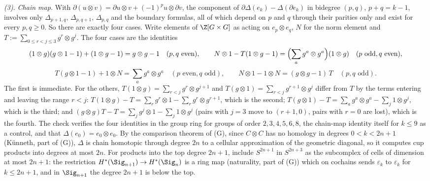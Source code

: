 \emph{(3).} \emph{Chain map.} With $\partial(u \otimes v) = \partial u \otimes v + (-1)^{p}u \otimes \partial v$, the component of $\partial\Delta(e_{k}) - \Delta(\partial e_{k})$ in bidegree $(p, q)$, $p + q = k - 1$, involves only $\Delta_{p+1,q}$, $\Delta_{p,q+1}$, $\Delta_{p,q}$ and the boundary formulas, all of which depend on $p$ and $q$ through their parities only and exist for every $p, q \geq 0$. So there are exactly four cases. Write elements of $\Z[G \times G]$ as acting on $e_{p} \otimes e_{q}$, $N$ for the norm element and $T := \sum_{0 \leq r < j \leq 3} g^{r} \otimes g^{j}$. The four cases are the identities
\[
(1 \otimes g)(g \otimes 1 - 1) + (1 \otimes g - 1) = g \otimes g - 1 \quad (p, q \text{ even}), \qquad
N \otimes 1 - T(1 \otimes g - 1) = \Bigl(\sum_{a} g^{a} \otimes g^{a}\Bigr)(1 \otimes g) \quad (p \text{ odd}, q \text{ even}),
\]
\[
T(g \otimes 1 - 1) + 1 \otimes N = \sum_{a} g^{a} \otimes g^{a} \quad (p \text{ even}, q \text{ odd}), \qquad
N \otimes 1 - 1 \otimes N = (g \otimes g - 1)\,T \quad (p, q \text{ odd}).
\]
The first is immediate. For the others, $T(1 \otimes g) = \sum_{r < j} g^{r} \otimes g^{j+1}$ and $T(g \otimes 1) = \sum_{r<j} g^{r+1} \otimes g^{j}$ differ from $T$ by the terms entering and leaving the range $r < j$: $T(1 \otimes g) - T = \sum_{r} g^{r} \otimes 1 - \sum_{r} g^{r} \otimes g^{r+1}$, which is the second; $T(g \otimes 1) - T = \sum_{a} g^{a} \otimes g^{a} - \sum_{j} 1 \otimes g^{j}$, which is the third; and $(g \otimes g)T - T = \sum_{j} g^{j} \otimes 1 - \sum_{j} 1 \otimes g^{j}$ (pairs with $j = 3$ move to $(r+1, 0)$, pairs with $r = 0$ are lost), which is the fourth. The check verifies the four identities in the group ring for groups of order $2, 3, 4, 5, 6, 8$, the chain-map identity itself for $k \leq 9$ as a control, and that $\Delta(e_{0}) = e_{0} \otimes e_{0}$. By the comparison theorem of (G), since $C \otimes C$ has no homology in degrees $0 < k < 2n+1$ (K\"unneth, part of (G)), $\Delta$ is chain homotopic through degree $2n$ to a cellular approximation of the geometric diagonal, so it computes cup products into degrees at most $2n$. For products into the top degree $2n+1$, include $S^{2n+1}$ in $S^{2n+3}$ as the subcomplex of cells of dimension at most $2n+1$: the restriction $H^{*}(\Sig_{n+1}) \to H^{*}(\Sig_{n})$ is a ring map (naturality, part of (G)) which on cochains sends $\varepsilon_{k}$ to $\varepsilon_{k}$ for $k \leq 2n+1$, and in $\Sig_{n+1}$ the degree $2n+1$ is below the top.


